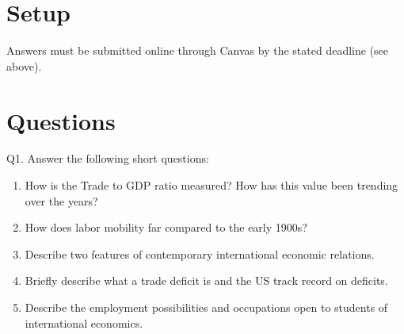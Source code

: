 \documentclass[12pt]{article}
\begin{document}
\singlespacing


\bigskip

\doublespacing



\section*{Setup}

\noindent 
Answers must be submitted online through Canvas by the stated deadline (see above).

\section*{Questions}

\noindent Q1. Answer the following short questions:

\begin{enumerate}[1)]
	
	\item How is the Trade to GDP ratio measured? How has this value been trending over the years?
	
	\vspace{1in}
	
	\item How does labor mobility far compared to the early 1900s?
	
	\vspace{1in}
	
	\item Describe two features of contemporary international economic relations.
	
	\vspace{1in}
	
	\newpage
	
	\item Briefly describe what a trade deficit is and the US track record on deficits. 
	
	\vspace{1in}
	
	\item Describe the employment possibilities and occupations open to students of international economics.
	
	\vspace{1in}
	
\end{enumerate}
\end{document}
